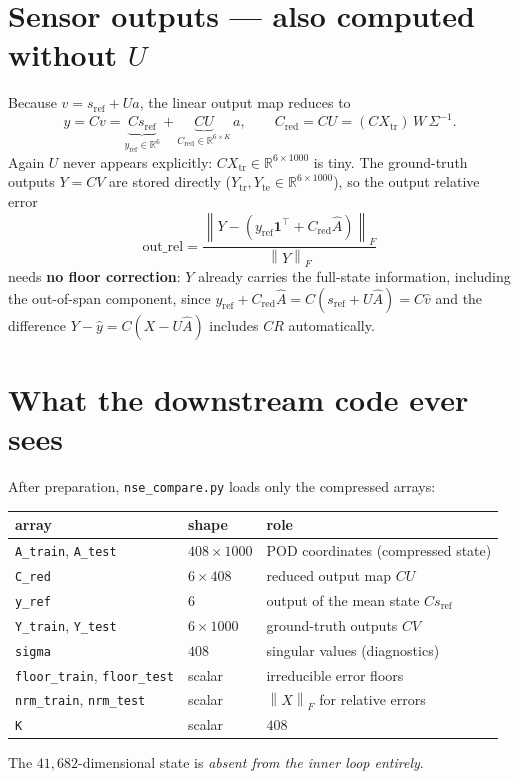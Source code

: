 \documentclass[11pt]{article}
\newcommand{\R}{\mathbb{R}}
\newcommand{\Xtr}{X_{\mathrm{tr}}}
\newcommand{\sref}{s_{\mathrm{ref}}}
\newcommand{\Cred}{C_{\mathrm{red}}}
\newcommand{\yref}{y_{\mathrm{ref}}}
\newcommand{\Fnorm}[1]{\left\lVert#1\right\rVert_F}
\newcommand{\code}[1]{\texttt{#1}}
\begin{document}
\section{Sensor outputs --- also computed without \texorpdfstring{$U$}{U}}
Because $v=\sref + Ua$, the linear output map reduces to
\begin{equation}
y = Cv
  = \underbrace{C\sref}_{\yref\in\R^{6}}
  + \underbrace{C U}_{\Cred\in\R^{6\times K}}\,a,
\qquad
\Cred = CU = (C\Xtr)\,W\,\Sigma^{-1}.
\end{equation}
Again $U$ never appears explicitly: $C\Xtr\in\R^{6\times1000}$ is tiny. The
ground-truth outputs $Y=CV$ are stored directly
($Y_{\mathrm{tr}},Y_{\mathrm{te}}\in\R^{6\times1000}$), so the output relative error
\begin{equation}
\text{out\_rel}
  = \frac{\Fnorm{Y - (\yref\mathbf 1^\top + \Cred\hat A)}}{\Fnorm{Y}}
\end{equation}
needs \textbf{no floor correction}: $Y$ already carries the full-state
information, including the out-of-span component, since
$\yref + \Cred\hat A = C(\sref + U\hat A) = C\hat v$ and the difference
$Y-\hat y = C(X - U\hat A)$ includes $CR$ automatically.

\section{What the downstream code ever sees}
After preparation, \code{nse\_compare.py} loads only the compressed arrays:
\begin{center}
\begin{tabular}{@{}lll@{}}
\toprule
array & shape & role \\
\midrule
\code{A\_train}, \code{A\_test} & $408\times1000$ & POD coordinates (compressed state) \\
\code{C\_red}                   & $6\times408$    & reduced output map $CU$ \\
\code{y\_ref}                   & $6$             & output of the mean state $C\sref$ \\
\code{Y\_train}, \code{Y\_test} & $6\times1000$   & ground-truth outputs $CV$ \\
\code{sigma}                    & $408$           & singular values (diagnostics) \\
\code{floor\_train}, \code{floor\_test} & scalar & irreducible error floors \\
\code{nrm\_train}, \code{nrm\_test}     & scalar & $\Fnorm{X}$ for relative errors \\
\code{K}                        & scalar          & $408$ \\
\bottomrule
\end{tabular}
\end{center}
The $41{,}682$-dimensional state is \emph{absent from the inner loop entirely}.
\end{document}
